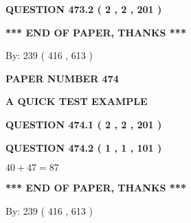 \documentclass[12pt]{article}
\begin{document}
{\textbf{\Large{QUESTION
473.2 
 ( 2 , 2 , 201 )
}}}
  
  
   
   
 \vspace{0.2in}
 
   
   
   
   
\vspace{1.0in} 
{\textbf{\large{ *** END OF PAPER, THANKS *** }}} 
   
   
\hspace{1.0in} By: 
 239 ( 416 ,  613 )
   
   
   
   
\newpage 
\setcounter{page}{ 
   474001 } 
   
   
   
   
 {\textbf{ \Large{ PAPER NUMBER  474  }}}
   
   
\vspace{0.2in}
   
   
   
   
   
   
 \vspace{0.2in}
{\LARGE {\textbf{ A QUICK TEST EXAMPLE}}}
   
   
  
\vspace{0.2in}
  
{\textbf{\Large{QUESTION
474.1 
 ( 2 , 2 , 201 )
}}}
  
  
  
\vspace{0.2in}
  
{\textbf{\Large{QUESTION
474.2 
 ( 1 , 1 , 101 )
}}}
  
  
 
 

$ %
40 +  %
47=   %
87$
 
 
   
   
 \vspace{0.2in}
 
   
   
   
   
\vspace{1.0in} 
{\textbf{\large{ *** END OF PAPER, THANKS *** }}} 
   
   
\hspace{1.0in} By: 
 239 ( 416 ,  613 )
   
   
   
   
\newpage 
\setcounter{page}{ 
   475001 } 
   
\end{document}
